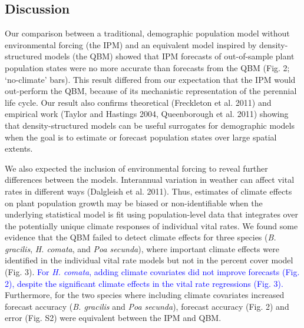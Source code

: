 \documentclass[12pt,]{article}
\begin{document}
\subsection{Discussion}\label{discussion}

Our comparison between a traditional, demographic population model
without environmental forcing (the IPM) and an equivalent model inspired
by density-structured models (the QBM) showed that IPM forecasts of
out-of-sample plant population states were no more accurate than
forecasts from the QBM (Fig. 2; `no-climate' bars). This result differed
from our expectation that the IPM would out-perform the QBM, because of
its mechanistic representation of the perennial life cycle. Our result
also confirms theoretical (Freckleton et al. 2011) and empirical work
(Taylor and Hastings 2004, Queenborough et al. 2011) showing that
density-structured models can be useful surrogates for demographic
models when the goal is to estimate or forecast population states over
large spatial extents.

We also expected the inclusion of environmental forcing to reveal
further differences between the models. Interannual variation in weather
can affect vital rates in different ways (Dalgleish et al. 2011). Thus,
estimates of climate effects on plant population growth may be biased or
non-identifiable when the underlying statistical model is fit using
population-level data that integrates over the potentially unique
climate responses of individual vital rates. We found some evidence that
the QBM failed to detect climate effects for three species (\emph{B.
gracilis}, \emph{H. comata}, and \emph{Poa secunda}), where important
climate effects were identified in the individual vital rate models but
not in the percent cover model (Fig. 3).
\textcolor{blue}{For \emph{H. comata}, adding climate covariates did not improve forecasts (Fig. 2), despite the significant climate effects in the vital rate regressions (Fig. 3).}
Furthermore, for the two species where including climate covariates
increased forecast accuracy (\emph{B. gracilis} and \emph{Poa secunda}),
forecast accuracy (Fig. 2) and error (Fig. S2) were equivalent between
the IPM and QBM.
\end{document}
